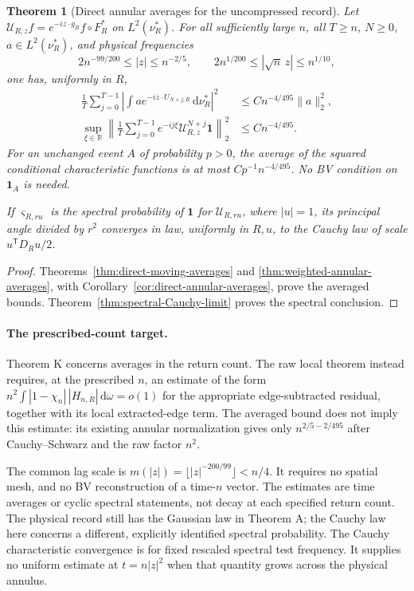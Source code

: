 \documentclass[11pt,reqno]{amsart}
\numberwithin{equation}{section}
\newtheorem{maintheorem}{Theorem}
\theoremstyle{definition}\newtheorem{definition}[theorem]{Definition}
\theoremstyle{remark}\newtheorem{remark}[theorem]{Remark}
\newcommand{\R}{\mathbb R}\newcommand{\Z}{\mathbb Z}\newcommand{\T}{\mathbb T}
\newcommand{\dd}{\,\mathrm d}\newcommand{\one}{\mathbf1}
\begin{document}
\begin{maintheorem}[Direct annular averages for the uncompressed record]
\label{thm:intro-direct-annular-averages}
Let $\mathcal U_{R,z}f=e^{-iz\cdot g_R}f\circ F_R^*$ on
$L^2(\nu_R^*)$. For all sufficiently large $n$, all $T\ge n$,
$N\ge0$, $a\in L^2(\nu_R^*)$, and physical frequencies
\[
 2n^{-99/200}\le|z|\le n^{-2/5},
 \qquad 2n^{1/200}\le|\sqrt n\,z|\le n^{1/10},
\]
one has, uniformly in $R$,
\begin{align*}
 \frac1T\sum_{j=0}^{T-1}
 \left|\int a e^{-iz\cdot U_{N+j,R}}\dd\nu_R^*\right|^2
                          &\le C n^{-4/495}\|a\|_2^2,\\
 \sup_{\xi\in\R}
 \left\|\frac1T\sum_{j=0}^{T-1}
         e^{-ij\xi}\mathcal U_{R,z}^{N+j}\one\right\|_2^2
                          &\le C n^{-4/495}.
\end{align*}
For an unchanged event $A$ of probability $p>0$, the average of the
squared conditional characteristic functions is at most
$C p^{-1}n^{-4/495}$. No BV condition on $\one_A$ is needed.

If $\varsigma_{R,ru}$ is the spectral probability of $\one$ for
$\mathcal U_{R,ru}$, where $|u|=1$, its principal angle divided by
$r^2$ converges in law, uniformly in $R,u$, to the Cauchy law of scale
$u^{\mathsf T}D_Ru/2$.
\end{maintheorem}
\begin{proof}
Theorems~\ref{thm:direct-moving-averages} and
\ref{thm:weighted-annular-averages}, with
Corollary~\ref{cor:direct-annular-averages}, prove the averaged bounds.
Theorem~\ref{thm:spectral-Cauchy-limit} proves the spectral conclusion.
\end{proof}

\paragraph{The prescribed-count target.}
Theorem K concerns averages in the return count. The raw local theorem
instead requires, at the prescribed $n$, an estimate of the form
$n^2\int|1-\chi_n|\,|H_{n,R}|\dd\omega=o(1)$ for the appropriate
edge-subtracted residual, together with its local extracted-edge term.
The averaged bound does not imply this estimate: its existing annular
normalization gives only $n^{2/5-2/495}$ after Cauchy--Schwarz and the
raw factor $n^2$.

The common lag scale is $m(|z|)=\lfloor|z|^{-200/99}\rfloor<n/4$.
It requires no spatial mesh, and no BV reconstruction of a time-$n$
vector. The estimates are time averages or cyclic spectral statements,
not decay at each specified return count. The physical record still has
the Gaussian law in Theorem A; the Cauchy law here concerns a different,
explicitly identified spectral probability.
The Cauchy characteristic convergence is for fixed rescaled spectral
test frequency. It supplies no uniform estimate at $t=n|z|^2$
when that quantity grows across the physical annulus.
\end{document}
